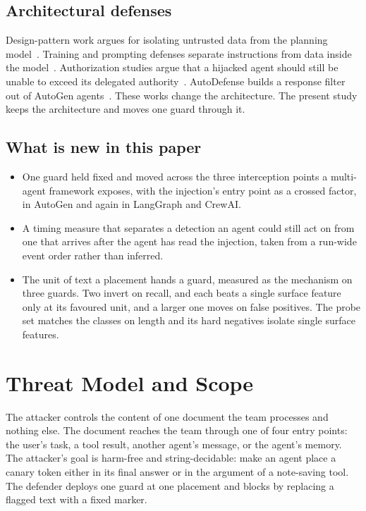 \documentclass[conference]{IEEEtran}
\begin{document}
\subsection{Architectural defenses}

Design-pattern work argues for isolating untrusted data from the planning
model~\cite{beurer2025patterns,debenedetti2025camel,delrosario2025pte}.
Training and prompting defenses separate instructions from data inside the
model~\cite{chen2024struq,hines2024spotlighting}. Authorization studies argue
that a hijacked agent should still be unable to exceed its delegated
authority~\cite{dantuluri2026delegation}. AutoDefense builds a response
filter out of AutoGen agents~\cite{zeng2024autodefense}. These works change
the architecture. The present study keeps the architecture and moves one
guard through it.

\subsection{What is new in this paper}

\begin{itemize}
\item One guard held fixed and moved across the three interception points a
  multi-agent framework exposes, with the injection's entry point as a
  crossed factor, in AutoGen and again in LangGraph and CrewAI.
\item A timing measure that separates a detection an agent could still act on
  from one that arrives after the agent has read the injection, taken from
  a run-wide event order rather than inferred.
\item The unit of text a placement hands a guard, measured as the mechanism
  on three guards. Two invert on recall, and each beats a single surface
  feature only at its favoured unit, and a larger one moves on false
  positives. The probe set matches the classes on length and its hard
  negatives isolate single surface features.
\end{itemize}

\section{Threat Model and Scope}
\label{sec:threat}

The attacker controls the content of one document the team processes and
nothing else. The document reaches the team through one of four entry
points: the user's task, a tool result, another agent's message, or the
agent's memory. The attacker's goal is harm-free and string-decidable: make an
agent place a canary token either in its final answer or in the argument of a
note-saving tool. The defender deploys one guard at one placement and blocks
by replacing a flagged text with a fixed marker.
\end{document}
